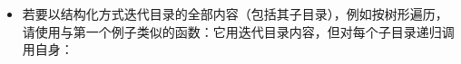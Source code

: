 \begin{itemize}
\begin{codeblockbg}
\begin{Verbatim}[commandchars=\\\{\},breaklines=true,breakanywhere=true,fontsize=\codefont,xleftmargin=17bp]
\PYG{+w}{        }\PYG{n}{std}\PYG{o}{:}\PYG{o}{:}\PYG{n}{cout}\PYG{+w}{ }\PYG{o}{\PYGZlt{}}\PYG{o}{\PYGZlt{}}\PYG{+w}{ }\PYG{l+s}{\PYGZdq{}}\PYG{l+s}{ }\PYG{l+s}{\PYGZdq{}}\PYG{+w}{ }\PYG{o}{\PYGZlt{}}\PYG{o}{\PYGZlt{}}\PYG{+w}{ }\PYG{n}{filename}\PYG{+w}{ }\PYG{o}{\PYGZlt{}}\PYG{o}{\PYGZlt{}}\PYG{+w}{ }\PYG{n}{std}\PYG{o}{:}\PYG{o}{:}\PYG{n}{endl}\PYG{p}{;}
\PYG{+w}{      }\PYG{k}{else}
\PYG{+w}{        }\PYG{n}{std}\PYG{o}{:}\PYG{o}{:}\PYG{n}{cout}\PYG{+w}{ }\PYG{o}{\PYGZlt{}}\PYG{o}{\PYGZlt{}}\PYG{+w}{ }\PYG{l+s}{\PYGZdq{}}\PYG{l+s}{[?]}\PYG{l+s}{\PYGZdq{}}\PYG{+w}{ }\PYG{o}{\PYGZlt{}}\PYG{o}{\PYGZlt{}}\PYG{+w}{ }\PYG{n}{filename}\PYG{+w}{ }\PYG{o}{\PYGZlt{}}\PYG{o}{\PYGZlt{}}\PYG{+w}{ }\PYG{n}{std}\PYG{o}{:}\PYG{o}{:}\PYG{n}{endl}\PYG{p}{;}
\PYG{+w}{    }\PYG{p}{\PYGZcb{}}
\PYG{+w}{  }\PYG{p}{\PYGZcb{}}
\PYG{p}{\PYGZcb{}}
\end{Verbatim}
\end{codeblockbg}



\item 若要以结构化方式迭代目录的全部内容（包括其子目录），例如按树形遍历，请使用与第一个例子类似的函数：它用迭代目录内容，但对每个子目录递归调用自身：




\end{itemize}
